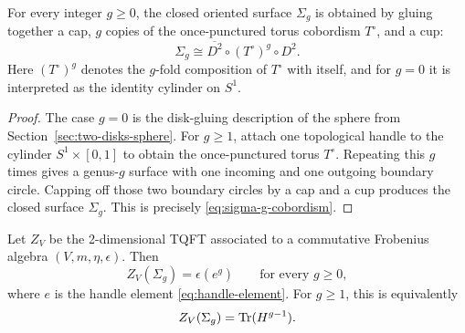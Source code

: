 \begin{proposition}\label{prop:sigma-g-decomposition}
For every integer $g \geq 0$, the closed oriented surface $\Sigma_g$ is obtained by gluing together a cap, $g$ copies of the once-punctured torus cobordism $T^\circ$, and a cup:
\begin{equation}\label{eq:sigma-g-cobordism}
\Sigma_g \cong \overline{D^2} \circ (T^\circ)^g \circ D^2.
\end{equation}
Here $(T^\circ)^g$ denotes the $g$-fold composition of $T^\circ$ with itself, and for $g=0$ it is interpreted as the identity cylinder on $S^1$.
\end{proposition}

\begin{proof}
The case $g=0$ is the disk-gluing description of the sphere from Section~\ref{sec:two-disks-sphere}. For $g\geq 1$, attach one topological handle to the cylinder $S^1\times[0,1]$ to obtain the once-punctured torus $T^\circ$. Repeating this $g$ times gives a genus-$g$ surface with one incoming and one outgoing boundary circle. Capping off those two boundary circles by a cap and a cup produces the closed surface $\Sigma_g$. This is precisely \eqref{eq:sigma-g-cobordism}.
\end{proof}

\begin{theorem}\label{thm:genus-g-handle}
Let $Z_V$ be the 2-dimensional TQFT associated to a commutative Frobenius algebra $(V,m,\eta,\epsilon)$. Then
\begin{equation}\label{eq:genus-g-epsilon-eg}
Z_V(\Sigma_g)=\epsilon(e^g)
\qquad
\text{for every } g \geq 0,
\end{equation}
where $e$ is the handle element \eqref{eq:handle-element}. For $g\geq 1$, this is equivalently
\begin{equation}\label{eq:genus-g-trace}
Z_V(\Sigma_g)=\operatorname{Tr}(H^{g-1}).
\end{equation}
\end{theorem}

